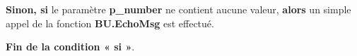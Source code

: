 \documentclass[a4paper,10pt]{article}
\begin{document}
\begin{justify}
    \textbf{\color{cond}Sinon, si} le paramètre \textbf{\color{vars}p\_number} ne contient aucune valeur, \textbf{\color{cond}alors} un simple appel de la fonction \textbf{\color{func}BU.EchoMsg} est effectué.
\end{justify}

\begin{justify}
    \textbf{\color{cond}Fin de la condition « si »}.
\end{justify}
\end{document}
